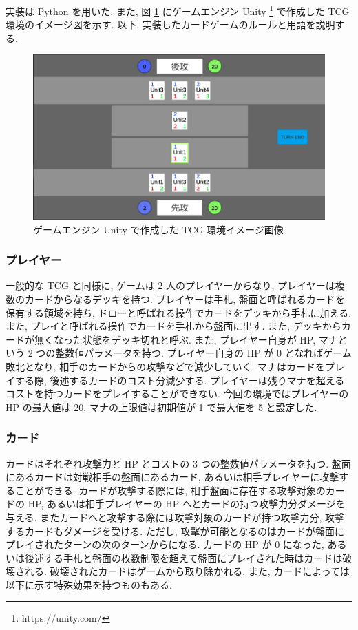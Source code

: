 \documentclass[12pt]{jarticle}
\begin{document}
実装は Python を用いた.
また, 図 \ref{fig:CardGameDemo} にゲームエンジン Unity \footnote[2]{https://unity.com/} で作成した TCG 環境のイメージ図を示す.
以下, 実装したカードゲームのルールと用語を説明する. 
\vspace{-0.3cm}
\begin{figure}[ht]
  \centering
  \includegraphics[width=170mm]{assets/cardgamedemo.eps}
  \vspace{-0.3cm}
  \caption{ゲームエンジン Unity で作成した TCG 環境イメージ画像}
  \label{fig:CardGameDemo}
\end{figure}
\subsubsection{プレイヤー}
一般的な TCG と同様に, ゲームは 2 人のプレイヤーからなり, プレイヤーは複数のカードからなるデッキを持つ. 
プレイヤーは手札, 盤面と呼ばれるカードを保有する領域を持ち, ドローと呼ばれる操作でカードをデッキから手札に加える. また, プレイと呼ばれる操作でカードを手札から盤面に出す. また, デッキからカードが無くなった状態をデッキ切れと呼ぶ.  
また, プレイヤー自身が HP, マナという 2 つの整数値パラメータを持つ.
プレイヤー自身の HP が 0 となればゲーム敗北となり, 相手のカードからの攻撃などで減少していく.
マナはカードをプレイする際, 後述するカードのコスト分減少する. プレイヤーは残りマナを超えるコストを持つカードをプレイすることができない. 
今回の環境ではプレイヤーの HP の最大値は 20, マナの上限値は初期値が 1 で最大値を 5 と設定した.
\subsubsection{カード}
カードはそれぞれ攻撃力と HP とコストの 3 つの整数値パラメータを持つ.  盤面にあるカードは対戦相手の盤面にあるカード, あるいは相手プレイヤーに攻撃することができる. カードが攻撃する際には, 相手盤面に存在する攻撃対象のカードの HP, あるいは相手プレイヤーの HP へとカードの持つ攻撃力分ダメージを与える. またカードへと攻撃する際には攻撃対象のカードが持つ攻撃力分, 攻撃するカードもダメージを受ける.
ただし, 攻撃が可能となるのはカードが盤面にプレイされたターンの次のターンからになる. 
カードの HP が 0 になった, あるいは後述する手札と盤面の枚数制限を超えて盤面にプレイされた時はカードは破壊される. 破壊されたカードはゲームから取り除かれる. 
また, カードによっては以下に示す特殊効果を持つものもある.
\end{document}
